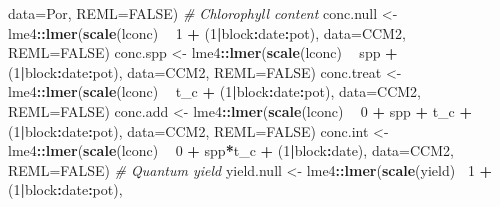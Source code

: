 \documentclass[]{scrartcl}
\newenvironment{Shaded}{\begin{snugshade}}{\end{snugshade}}
\newcommand{\CommentTok}[1]{\textcolor[rgb]{0.56,0.35,0.01}{\textit{#1}}}
\newcommand{\DataTypeTok}[1]{\textcolor[rgb]{0.13,0.29,0.53}{#1}}
\newcommand{\DecValTok}[1]{\textcolor[rgb]{0.00,0.00,0.81}{#1}}
\newcommand{\KeywordTok}[1]{\textcolor[rgb]{0.13,0.29,0.53}{\textbf{#1}}}
\newcommand{\NormalTok}[1]{#1}
\newcommand{\OperatorTok}[1]{\textcolor[rgb]{0.81,0.36,0.00}{\textbf{#1}}}
\newcommand{\OtherTok}[1]{\textcolor[rgb]{0.56,0.35,0.01}{#1}}
\newcommand{\StringTok}[1]{\textcolor[rgb]{0.31,0.60,0.02}{#1}}
\begin{document}
\begin{Shaded}
\begin{Highlighting}[]
{{{{{{{{{{{{                              \DataTypeTok{data=}\NormalTok{Por, }\DataTypeTok{REML=}\OtherTok{FALSE}\NormalTok{)}
  \CommentTok{# Chlorophyll content}
\NormalTok{    conc.null <-}\StringTok{ }\NormalTok{lme4}\OperatorTok{::}\KeywordTok{lmer}\NormalTok{(}\KeywordTok{scale}\NormalTok{(lconc) }\OperatorTok{~}\StringTok{ }\DecValTok{1} \OperatorTok{+}\StringTok{ }\NormalTok{(}\DecValTok{1}\OperatorTok{|}\NormalTok{block}\OperatorTok{:}\NormalTok{date}\OperatorTok{:}\NormalTok{pot), }
                            \DataTypeTok{data=}\NormalTok{CCM2, }\DataTypeTok{REML=}\OtherTok{FALSE}\NormalTok{)}
\NormalTok{    conc.spp <-}\StringTok{ }\NormalTok{lme4}\OperatorTok{::}\KeywordTok{lmer}\NormalTok{(}\KeywordTok{scale}\NormalTok{(lconc) }\OperatorTok{~}\StringTok{ }\NormalTok{spp }\OperatorTok{+}\StringTok{ }\NormalTok{(}\DecValTok{1}\OperatorTok{|}\NormalTok{block}\OperatorTok{:}\NormalTok{date}\OperatorTok{:}\NormalTok{pot), }
                           \DataTypeTok{data=}\NormalTok{CCM2, }\DataTypeTok{REML=}\OtherTok{FALSE}\NormalTok{)}
\NormalTok{    conc.treat <-}\StringTok{ }\NormalTok{lme4}\OperatorTok{::}\KeywordTok{lmer}\NormalTok{(}\KeywordTok{scale}\NormalTok{(lconc) }\OperatorTok{~}\StringTok{ }\NormalTok{t_c }\OperatorTok{+}\StringTok{ }\NormalTok{(}\DecValTok{1}\OperatorTok{|}\NormalTok{block}\OperatorTok{:}\NormalTok{date}\OperatorTok{:}\NormalTok{pot), }
                             \DataTypeTok{data=}\NormalTok{CCM2, }\DataTypeTok{REML=}\OtherTok{FALSE}\NormalTok{)}
\NormalTok{    conc.add <-}\StringTok{ }\NormalTok{lme4}\OperatorTok{::}\KeywordTok{lmer}\NormalTok{(}\KeywordTok{scale}\NormalTok{(lconc) }\OperatorTok{~}\StringTok{ }\DecValTok{0} \OperatorTok{+}\StringTok{ }\NormalTok{spp }\OperatorTok{+}\StringTok{ }\NormalTok{t_c }\OperatorTok{+}\StringTok{ }\NormalTok{(}\DecValTok{1}\OperatorTok{|}\NormalTok{block}\OperatorTok{:}\NormalTok{date}\OperatorTok{:}\NormalTok{pot), }
                           \DataTypeTok{data=}\NormalTok{CCM2, }\DataTypeTok{REML=}\OtherTok{FALSE}\NormalTok{)}
\NormalTok{    conc.int <-}\StringTok{ }\NormalTok{lme4}\OperatorTok{::}\KeywordTok{lmer}\NormalTok{(}\KeywordTok{scale}\NormalTok{(lconc) }\OperatorTok{~}\StringTok{ }\DecValTok{0} \OperatorTok{+}\StringTok{ }\NormalTok{spp}\OperatorTok{*}\NormalTok{t_c }\OperatorTok{+}\StringTok{ }\NormalTok{(}\DecValTok{1}\OperatorTok{|}\NormalTok{block}\OperatorTok{:}\NormalTok{date),}
                           \DataTypeTok{data=}\NormalTok{CCM2, }\DataTypeTok{REML=}\OtherTok{FALSE}\NormalTok{)}
  \CommentTok{# Quantum yield}
\NormalTok{    yield.null <-}\StringTok{ }\NormalTok{lme4}\OperatorTok{::}\KeywordTok{lmer}\NormalTok{(}\KeywordTok{scale}\NormalTok{(yield)}\OperatorTok{~}\StringTok{ }\DecValTok{1} \OperatorTok{+}\StringTok{ }\NormalTok{(}\DecValTok{1}\OperatorTok{|}\NormalTok{block}\OperatorTok{:}\NormalTok{date}\OperatorTok{:}\NormalTok{pot), }
}}}}}}}}}}}}
\end{Highlighting}
\end{Shaded}
\end{document}
